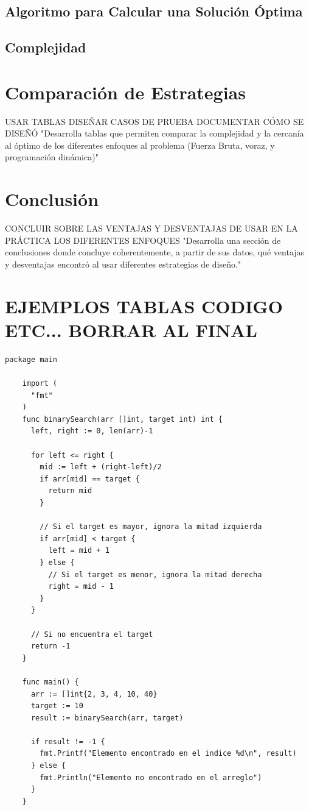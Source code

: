 \documentclass[letterpaper,10pt]{article}
\begin{document}
\subsection{Algoritmo para Calcular una Solución Óptima}
\label{subsec:algoritmo_solucion_optima}
\subsection{Complejidad}
\label{subsec:complejidad_programacion_dinamica}

\section{Comparación de Estrategias}
\label{sec:comparacion_estrategias}
USAR TABLAS DISEÑAR CASOS DE PRUEBA DOCUMENTAR CÓMO SE DISEÑÓ
"Desarrolla tablas que permiten comparar la complejidad y la cercanía al óptimo de los diferentes enfoques al problema (Fuerza Bruta, voraz, y programación dinámica)"

\section{Conclusión}
\label{sec:conclusion}
CONCLUIR SOBRE LAS VENTAJAS Y DESVENTAJAS DE USAR EN LA PRÁCTICA LOS DIFERENTES ENFOQUES
"Desarrolla una sección de conclusiones donde concluye coherentemente, a partir de sus datos, qué ventajas y desventajas encontró al usar diferentes estrategias de diseño."
\section{EJEMPLOS TABLAS CODIGO ETC... BORRAR AL FINAL}
\begin{lstlisting}[caption={Algoritmo de búsqueda binaria en Go}, label={lst:binary_search}]
    package main
    
    import (
      "fmt"
    )
    func binarySearch(arr []int, target int) int {
      left, right := 0, len(arr)-1
      
      for left <= right {
        mid := left + (right-left)/2
        if arr[mid] == target {
          return mid
        }
        
        // Si el target es mayor, ignora la mitad izquierda
        if arr[mid] < target {
          left = mid + 1
        } else {
          // Si el target es menor, ignora la mitad derecha
          right = mid - 1
        }
      }
      
      // Si no encuentra el target
      return -1
    }
    
    func main() {
      arr := []int{2, 3, 4, 10, 40}
      target := 10
      result := binarySearch(arr, target)
      
      if result != -1 {
        fmt.Printf("Elemento encontrado en el indice %d\n", result)
      } else {
        fmt.Println("Elemento no encontrado en el arreglo")
      }
    }
\end{lstlisting}
\end{document}
